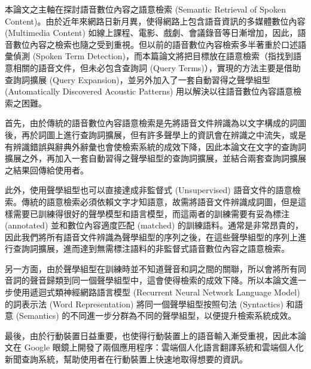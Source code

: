 \begin{zhAbstract}  %
本論文之主軸在探討語音數位內容之語意檢索 (Semantic Retrieval of Spoken Content)。由於近年來網路日新月異，使得網路上包含語音資訊的多媒體數位內容 (Multimedia Content) 如線上課程、電影、戲劇、會議錄音等日漸增加，因此，語音數位內容之檢索也隨之受到重視。但以前的語音數位內容檢索多半著重於口述語彙偵測 (Spoken Term Detection)，而本篇論文將把目標放在語意檢索（指找到語意相關的語音文件，但未必包含查詢詞 (Query Terms)），實現的方法主要是借助查詢詞擴展 (Query Expansion)，並另外加入了一套自動習得之聲學組型 (Automatically Discovered Acoustic Patterns) 用以解決以往語音數位內容語意檢索之困難。

首先，由於傳統的語音數位內容語意檢索是先將語音文件辨識為以文字構成的詞圖後，再於詞圖上進行查詢詞擴展，但有許多聲學上的資訊會在辨識之中流失，或是有辨識錯誤與辭典外辭彙也會使檢索系統的成效下降，因此本論文在文字的查詢詞擴展之外，再加入一套自動習得之聲學組型的查詢詞擴展，並結合兩套查詢詞擴展之結果回傳給使用者。

此外，使用聲學組型也可以直接達成非監督式 (Unsupervised) 語音文件的語意檢索。傳統的語意檢索必須依賴文字才知語意，故需將語音文件辨識成詞圖，但是這樣需要已訓練得很好的聲學模型和語言模型，而這兩者的訓練需要有妥為標注 (annotated) 並和數位內容適度匹配 (matched) 的訓練語料。通常是非常昂貴的，因此我們將所有語音文件辨識為聲學組型的序列之後，在這些聲學組型的序列上進行查詢詞擴展，進而達到無需標注語料的非監督式語音數位內容之語意檢索。

另一方面，由於聲學組型在訓練時並不知道聲音和詞之間的關聯，所以會將所有同音詞的聲音歸類到同一個聲學組型中，這會使得檢索的成效下降。所以本論文進一步使用遞迴式類神經網路語言模型 (Recurrent Neural Network Language Model) 的詞表示法 (Word Representation) 將同一個聲學組型按照句法 (Syntactics) 和語意 (Semantics) 的不同進一步分群為不同的聲學組型，以便提升檢索系統成效。

最後，由於行動裝置日益重要，也使得行動裝置上的語音輸入漸受重視，因此本論文在 Google 眼鏡上開發了兩個應用程序：雲端個人化語言翻譯系統和雲端個人化新聞查詢系統，幫助使用者在行動裝置上快速地取得想要的資訊。

\end{zhAbstract}

{
\mysinglespacing\selectfont
\tableofcontents %

\listoffigures  %

\listoftables  %
\par
}

\newpage
\setcounter{page}{1}
